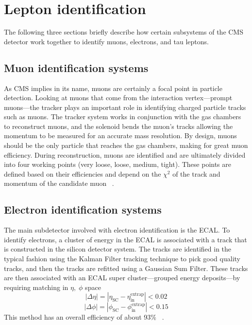 
\section{Lepton identification}
The following three sections briefly describe how certain subsystems of the CMS detector work together to identify muons, electrons, and tau leptons. 

\subsection{Muon identification systems}

As CMS implies in its name, muons are certainly a focal point in particle detection. 
Looking at muons that come from the interaction vertex---prompt muons---the tracker plays an important role in identifying charged particle tracks such as muons. 
The tracker system works in conjunction with the gas chambers to reconstruct muons, and the solenoid bends the muon's tracks allowing the momentum to be measured for an accurate mass resolution. By design, muons should be the only particle that reaches the gas chambers, making for great muon efficiency. 
During reconstruction, muons are identified and are ultimately divided into four working points (very loose, loose, medium, tight). These points are defined based on their efficiencies and depend on the $\chi^2$ of the track and momentum of the candidate muon ~\cite{CMS-PAS-PFT-09-001,Kratschmer:1956760}.


\subsection{Electron identification systems}
The main subdetector involved with electron identification is the ECAL. To identify electrons, a cluster of energy in the ECAL is associated with a track that is constructed in the silicon detector system. 
The tracks are identified in the typical fashion using the Kalman Filter tracking technique to pick good quality tracks, and then the tracks are refitted using a Gaussian Sum Filter. 
These tracks are then associated with an ECAL super cluster---grouped energy deposits---by requiring matching in $\eta,\;\phi$ space
\begin{equation}|\Delta\eta| = |\eta_{\text{SC}} - \eta_{\text{in}}^{\text{extrap}}| < 0.02\end{equation}
\begin{equation}|\Delta\phi| = |\phi_{\text{SC}} - \phi_{\text{in}}^{\text{extrap}}| < 0.15\end{equation}
This method has an overall efficiency of about 93\% ~\cite{Khachatryan:2015hwa}. 

